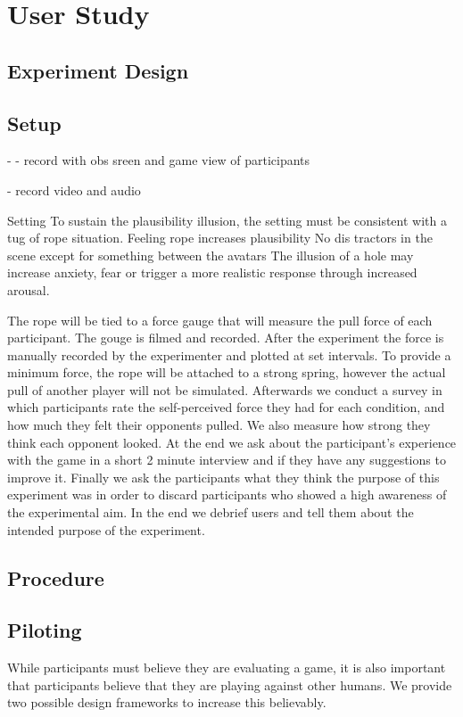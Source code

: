 
\section{User Study}

\subsection{Experiment Design}

\subsection{Setup}
-
- record with obs sreen and game view of participants

- record video and audio

Setting 
To sustain the plausibility illusion, the setting must be consistent with a tug of rope situation.
Feeling rope increases plausibility
No dis tractors in the scene except for something between the avatars
The illusion of a hole may increase anxiety, fear or trigger a more realistic response through increased arousal.



The rope will be tied to a force gauge that will measure the pull force of each participant. The gouge is filmed and recorded. After the experiment the force is manually recorded by the experimenter and plotted at set intervals. To provide a minimum force, the rope will be attached to a strong spring, however the actual pull of another player will not be simulated. 
Afterwards we conduct a survey in which participants rate the self-perceived force they had for each condition, and how much they felt their opponents pulled. We also measure how strong they think each opponent looked. 
At the end we ask about the participant’s experience with the game in a short 2 minute interview and if they have any suggestions to improve it. Finally we ask the participants what they think the purpose of this experiment was in order to discard participants who showed a high awareness of the experimental aim. In the end we debrief users and tell them about the intended purpose of the experiment.

\subsection{Procedure}
\subsection{Piloting}
While participants must believe they are evaluating a game, it is also important that participants believe that they are playing against other humans. We provide two possible design frameworks to increase this believably. 

